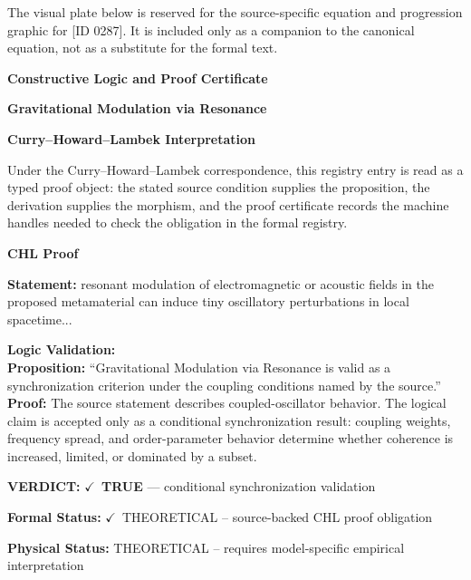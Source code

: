 \begingroup\footnotesize\sloppy
The visual plate below is reserved for the source-specific equation and progression graphic for [ID 0287]. It is included only as a companion to the canonical equation, not as a substitute for the formal text.
\par\endgroup
\ifTZPDarkEdition
{}
\fi

\clearpage
\begingroup\tzpsupportsetup
\noindent\textbf{\fontsize{10.8pt}{12.8pt}\selectfont [ID 0287] Constructive Logic and Proof Certificate}\par
\noindent\textbf{\fontsize{10pt}{12pt}\selectfont Gravitational Modulation via Resonance}\par
\vspace{0.45em}
\begingroup
\footnotesize
\setlength{\parskip}{0.22em}
\setlength{\parindent}{0pt}
\noindent\textbf{Curry--Howard--Lambek Interpretation}\par
Under the Curry--Howard--Lambek correspondence, this registry entry is read as a typed proof
object: the stated source condition supplies the proposition, the derivation supplies the
morphism, and the proof certificate records the machine handles needed to check the obligation
in the formal registry.

\vspace{0.45em}
\noindent\textbf{CHL Proof}\par
\textbf{Statement:} resonant modulation of electromagnetic or acoustic fields in the proposed metamaterial
can induce tiny oscillatory perturbations in local spacetime...

\textbf{Logic Validation:}\\
\textbf{Proposition:} ``Gravitational Modulation via Resonance is valid as a synchronization criterion under the
coupling conditions named by the source.''\\
\textbf{Proof:} The source statement describes coupled-oscillator behavior. The logical claim is
accepted only as a conditional synchronization result: coupling weights, frequency
spread, and order-parameter behavior determine whether coherence is increased, limited,
or dominated by a subset.

\textbf{VERDICT:} \ensuremath{\checkmark}\ \textbf{TRUE} --- conditional synchronization validation

\textbf{Formal Status:} \ensuremath{\checkmark}\ THEORETICAL -- source-backed CHL proof obligation

\textbf{Physical Status:} THEORETICAL -- requires model-specific empirical interpretation
\par\vspace{0.45em}
\par
\ifTZPDarkEdition
{}
\fi
\endgroup
\endgroup
